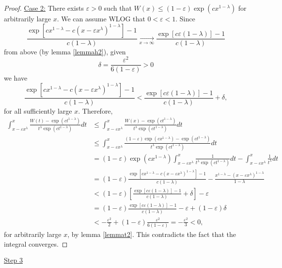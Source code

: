\documentclass[11pt]{amsart}
\numberwithin{equation}{section}
\newcommand{\difrac}{\displaystyle \frac}
\begin{document}
\begin{proof}
\noindent \underline{Case 2:} There exists $\varepsilon > 0$ such that $W(x) \leq (1 - \varepsilon)\exp(cx^{1 - \lambda})$ for arbitrarily large $x$. We can assume WLOG that $0 < \varepsilon < 1$. Since $$\difrac{\exp[cx^{1 - \lambda} - c(x - \varepsilon x^\lambda)^{1 - \lambda}] - 1}{c(1 - \lambda)} \xrightarrow[x \to \infty]{} \difrac{\exp[c \varepsilon (1 - \lambda)] - 1}{c(1 - \lambda)}$$ from above (by lemma \ref{lemmah2}), given $$\delta = \difrac{\varepsilon^2}{6(1 - \varepsilon)} > 0$$ we have $$\difrac{\exp[cx^{1 - \lambda} - c(x - \varepsilon x^\lambda)^{1 - \lambda}] - 1}{c(1 - \lambda)} < \difrac{\exp[c \varepsilon (1 - \lambda)] - 1}{c(1 - \lambda)} + \delta,$$ for all sufficiently large $x$. Therefore, \begin{equation*} \begin{split} \int_{x - \varepsilon x^\lambda}^{x} \difrac{W(t) - \exp(ct^{1 - \lambda})}{t^\lambda \exp(ct^{1 - \lambda})} dt & \leq \int_{x - \varepsilon x^\lambda}^{x} \difrac{W(x) - \exp(ct^{1 - \lambda})}{t^\lambda \exp(ct^{1 - \lambda})} dt \\ & \leq \int_{x - \varepsilon x^\lambda}^{x} \difrac{(1 - \varepsilon)\exp(cx^{1 - \lambda}) - \exp(ct^{1 - \lambda})}{t^\lambda \exp(ct^{1 - \lambda})} dt \\ & = (1 - \varepsilon) \exp(cx^{1 - \lambda}) \int_{x - \varepsilon x^\lambda}^{x} \difrac{1}{t^\lambda \exp(ct^{1 - \lambda})} dt - \int_{x - \varepsilon x^\lambda}^{x} \difrac{1}{t^\lambda} dt \\ & = (1 - \varepsilon) \difrac{\exp[cx^{1 - \lambda} - c(x - \varepsilon x^{\lambda})^{1 - \lambda}] - 1}{c(1 - \lambda)} - \difrac{x^{1 - \lambda} - (x - \varepsilon x^{\lambda})^{1 - \lambda}}{1 - \lambda} \\ & < (1 - \varepsilon) \left[\difrac{\exp[c \varepsilon (1 - \lambda)] - 1}{c(1 - \lambda)} + \delta\right] - \varepsilon \\ & = (1 - \varepsilon)\difrac{\exp[c \varepsilon (1 - \lambda)] - 1}{c(1 - \lambda)} - \varepsilon + (1 - \varepsilon)\delta \\ & < -\difrac{\varepsilon^2}{2} + (1 - \varepsilon) \difrac{\varepsilon^2}{6(1 - \varepsilon)} = -\difrac{\varepsilon^2}{3} < 0, \end{split} \end{equation*} for arbitrarily large $x$, by lemma \ref{lemmat2}. This contradicts the fact that the integral converges. \end{proof}

\begin{center} \underline{Step 3} \end{center}
\end{document}

